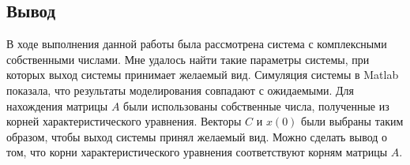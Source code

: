 \subsection{Вывод}
В ходе выполнения данной работы была рассмотрена система с комплексными собственными числами. 
Мне удалось найти такие параметры системы, при которых выход системы принимает желаемый вид. 
Симуляция системы в Matlab показала, что результаты моделирования совпадают с ожидаемыми. 
Для нахождения матрицы $A$ были использованы собственные числа, полученные из корней характеристического уравнения. 
Векторы $C$ и $x(0)$ были выбраны таким образом, чтобы выход системы принял желаемый вид.  
Можно сделать вывод о том, что корни характеристического уравнения соответствуют корням 
матрицы $A$. 